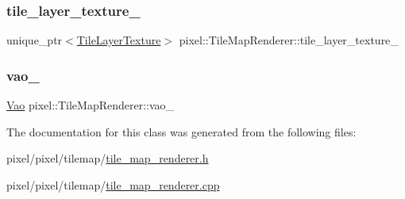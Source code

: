 \mbox{\label{classpixel_1_1_tile_map_renderer_a5a69f4f77b503ffeadffb0269050a2b1}} 
\subsubsection{\texorpdfstring{tile\+\_\+layer\+\_\+texture\+\_\+}{tile\_layer\_texture\_}}
{\footnotesize\ttfamily unique\+\_\+ptr$<$\hyperlink{classpixel_1_1_tile_layer_texture}{Tile\+Layer\+Texture}$>$ pixel\+::\+Tile\+Map\+Renderer\+::tile\+\_\+layer\+\_\+texture\+\_\+\hspace{0.3cm}{\ttfamily [private]}}

\mbox{\label{classpixel_1_1_tile_map_renderer_a017d4722cedbc963ef798beb530f2776}} 
\subsubsection{\texorpdfstring{vao\+\_\+}{vao\_}}
{\footnotesize\ttfamily \hyperlink{classpixel_1_1graphics_1_1_vao}{Vao} pixel\+::\+Tile\+Map\+Renderer\+::vao\+\_\+\hspace{0.3cm}{\ttfamily [private]}}



The documentation for this class was generated from the following files\+:\begin{DoxyCompactItemize}
\item 
pixel/pixel/tilemap/\hyperlink{tile__map__renderer_8h}{tile\+\_\+map\+\_\+renderer.\+h}\item 
pixel/pixel/tilemap/\hyperlink{tile__map__renderer_8cpp}{tile\+\_\+map\+\_\+renderer.\+cpp}\end{DoxyCompactItemize}

